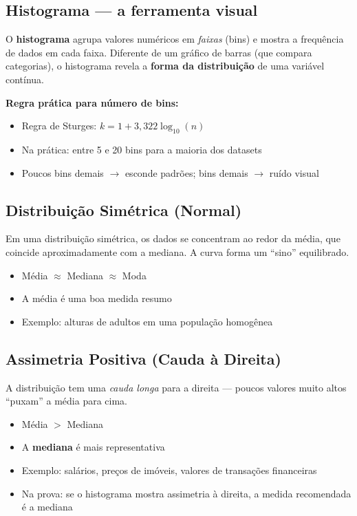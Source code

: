 \subsection*{Histograma — a ferramenta visual}

O \textbf{histograma} agrupa valores numéricos em \emph{faixas} (bins) e mostra a frequência de dados em cada faixa. Diferente de um gráfico de barras (que compara categorias), o histograma revela a \textbf{forma da distribuição} de uma variável contínua.

\textbf{Regra prática para número de bins:}
\begin{itemize}[leftmargin=*]
  \item Regra de Sturges: $k = 1 + 3{,}322 \log_{10}(n)$
  \item Na prática: entre 5 e 20 bins para a maioria dos datasets
  \item Poucos bins demais $\to$ esconde padrões; bins demais $\to$ ruído visual
\end{itemize}

\subsection*{Distribuição Simétrica (Normal)}

Em uma distribuição simétrica, os dados se concentram ao redor da média, que coincide aproximadamente com a mediana. A curva forma um ``sino'' equilibrado.

\begin{itemize}[leftmargin=*]
  \item Média $\approx$ Mediana $\approx$ Moda
  \item A média é uma boa medida resumo
  \item Exemplo: alturas de adultos em uma população homogênea
\end{itemize}

\subsection*{Assimetria Positiva (Cauda à Direita)}

A distribuição tem uma \emph{cauda longa} para a direita --- poucos valores muito altos ``puxam'' a média para cima.

\begin{itemize}[leftmargin=*]
  \item Média $>$ Mediana
  \item A \textbf{mediana} é mais representativa
  \item Exemplo: salários, preços de imóveis, valores de transações financeiras
  \item Na prova: se o histograma mostra assimetria à direita, a medida recomendada é a mediana
\end{itemize}

